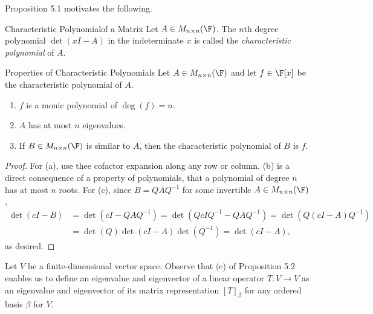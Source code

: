 \documentclass[linearalgebraI]{subfiles}
\begin{document}
    \begin{remark}
        Proposition 5.1 motivates the following.
    \end{remark}

    \begin{definition}{Characteristic Polynomial}{of a Matrix}
        Let $A\in M_{n\times n}(\F)$. The $n$th degree polynomial $\det \left( xI-A \right)$ in the indeterminate $x$ is called the \emph{characteristic polynomial} of $A$.
    \end{definition}

    \begin{prop}{Properties of Characteristic Polynomials}
        Let $A\in M_{n\times n}(\F)$ and let $f\in\F[x]$ be the characteristic polynomial of $A$. 
        \begin{enumerate}
            \item $f$ is a monic polynomial of $\deg(f)=n$.
            \item $A$ has at most $n$ eigenvalues.
            \item If $B\in M_{n\times n}(\F)$ is similar to $A$, then the characteristic polynomial of $B$ is $f$.
        \end{enumerate}
    \end{prop}

    \begin{proof}
        For (a), use thee cofactor expansion along any row or column. (b) is a direct consequence of a property of polynomials, that a polynomial of degree $n$ has at most $n$ roots. For (c), since $B = QAQ^{-1}$ for some invertible $A\in M_{n\times n}(\F)$,
        \begin{align*}
            \det \left( cI-B \right) & = \det \left( cI-QAQ^{-1} \right) = \det \left( QcIQ^{-1} - QAQ^{-1} \right) = \det \left( Q \left( cI-A \right) Q^{-1} \right) \\
                                            & = \det (Q) \det (cI-A) \det \left( Q^{-1} \right) = \det (cI-A),
        \end{align*} 
        as desired.
    \end{proof}

    \begin{remark}
        Let $V$ be a finite-dimensional vector space. Observe that (c) of Proposition 5.2 enables us to define an eigenvalue and eigenvector of a linear operator $T:V\to V$ as an eigenvalue and eigenvector of its matrix representation $\left[ T \right] _\beta$ for any ordered basis $\beta$ for $V$.
    \end{remark}
\end{document}
